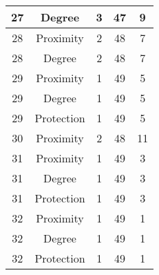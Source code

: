\documentclass[results.tex]{subfiles}
\begin{document}
\begin{center}
\begin{tabular}{| c || c | c | c | c |}
            \hline
            27                      & Degree                       & 3                      & 47                      & 9                    \\
            \hline
            28                      & Proximity                    & 2                      & 48                      & 7                    \\
            \hline
            28                      & Degree                       & 2                      & 48                      & 7                    \\
            \hline
            29                      & Proximity                    & 1                      & 49                      & 5                    \\
            \hline
            29                      & Degree                       & 1                      & 49                      & 5                    \\
            \hline
            29                      & Protection                   & 1                      & 49                      & 5                    \\
            \hline
            30                      & Proximity                    & 2                      & 48                      & 11                   \\
            \hline
            31                      & Proximity                    & 1                      & 49                      & 3                    \\
            \hline
            31                      & Degree                       & 1                      & 49                      & 3                    \\
            \hline
            31                      & Protection                   & 1                      & 49                      & 3                    \\
            \hline
            32                      & Proximity                    & 1                      & 49                      & 1                    \\
            \hline
            32                      & Degree                       & 1                      & 49                      & 1                    \\
            \hline
            32                      & Protection                   & 1                      & 49                      & 1                    \\

\end{tabular}
\end{center}
\end{document}
